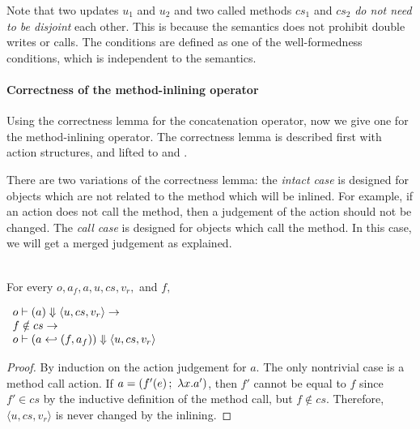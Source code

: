 Note that two updates $u_1$ and $u_2$ and two called methods $cs_1$
and $cs_2$ \emph{do not need to be disjoint} each other. This is
because the semantics does not prohibit double writes or calls. The
conditions are defined as one of the well-formedness conditions, which
is independent to the semantics.

\paragraph{Correctness of the method-inlining operator}

Using the correctness lemma for the concatenation operator, now we
give one for the method-inlining operator. The correctness lemma is
described first with action structures, and lifted to \Substep{} and
\Substeps{}.

There are two variations of the correctness lemma: the \emph{intact
  case} is designed for objects which are not related to the method
which will be inlined. For example, if an action does not call the
method, then a judgement of the action should not be changed. The
\emph{call case} is designed for objects which call the method. In
this case, we will get a merged judgement as explained.

\begin{lemma}
  \label{lem-inlinedm-action-intact}
  \mbox{}\\
  For every $o, a_f, a, u, cs, v_r,$ and $f,$
  \begin{center}
    \begin{math}
      \begin{array}{l}
        \semact{o}{a}{u}{cs}{v_r} \to \\
        f \notin cs \to \\
        \semact{o}{\inlinedm{a}{(f, a_f)}}{u}{cs}{v_r}
      \end{array}
    \end{math}
  \end{center}
\end{lemma}
\begin{proof}
  By induction on the action judgement for $a$. The only nontrivial
  case is a method call action. If $a = (\actcall{x}{f'}{e}{a'})$,
  then $f'$ cannot be equal to $f$ since $f' \in cs$ by the inductive
  definition of the method call, but $f \notin cs$. Therefore,
  $\langle u, cs, v_r \rangle$ is never changed by the inlining.
\end{proof}

